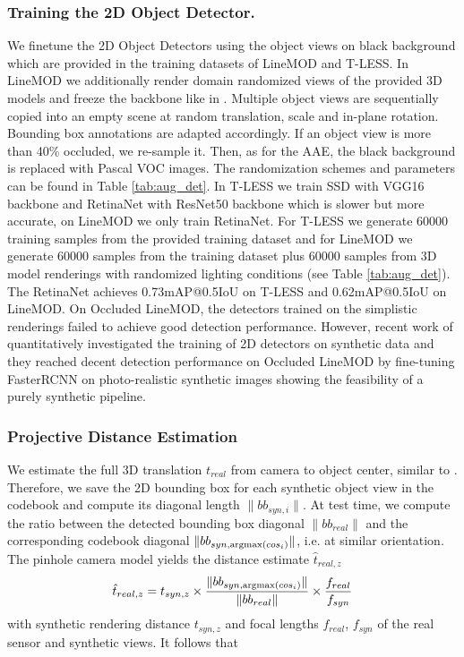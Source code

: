\subsubsection{Training the 2D Object Detector.} We finetune the 2D Object Detectors using the object views on black background  which are provided in the training datasets of LineMOD and T-LESS. In LineMOD we additionally render domain randomized views of the provided 3D models and freeze the backbone like in \cite{hinterstoisser2017pre}. Multiple object views are sequentially copied into an empty scene at random translation, scale and in-plane rotation. Bounding box annotations are adapted accordingly. If an object view is more than 40\% occluded, we re-sample it. Then, as for the \gls{AAE}, the black background is replaced with Pascal VOC images. The randomization schemes and parameters can be found in Table \ref{tab:aug_det}. In T-LESS we train SSD \citep{liu2016ssd} with VGG16 backbone and RetinaNet \citep{lin2018focal} with ResNet50 backbone which is slower but more accurate, on LineMOD we only train RetinaNet. For T-LESS we generate 60000 training samples from the provided training dataset and for LineMOD we generate 60000 samples from the training dataset plus 60000 samples from 3D model renderings with randomized lighting conditions (see Table \ref{tab:aug_det}). The RetinaNet achieves 0.73mAP@0.5IoU on T-LESS and 0.62mAP@0.5IoU on LineMOD. On Occluded LineMOD, the detectors trained on the simplistic renderings failed to achieve good detection performance. However, recent work of  \cite{Hodan2019PhotorealisticIS} quantitatively investigated the training of 2D detectors on synthetic data and they reached decent detection performance on Occluded LineMOD by fine-tuning FasterRCNN on photo-realistic synthetic images showing the feasibility of a purely synthetic pipeline.

\subsubsection{Projective Distance Estimation}
\label{sec:proj}
We estimate the full 3D translation $t_{real}$ from camera to object center, similar to \cite{kehl2017ssd}. Therefore, we save the 2D bounding box for each synthetic object view in the codebook and compute its diagonal length $\| bb_{syn,i} \|$. At test time, we compute the ratio between the detected bounding box diagonal $\| bb_{real} \|$ and the corresponding codebook diagonal $\| bb_{syn,{\operatorname*{argmax}} (cos_i) }\|$, i.e. at similar orientation. The pinhole camera model yields the distance estimate $\hat{t}_{real,z}$
\begin{equation}
\label{eq:dist}
\hat{t}_{real,z} = t_{syn,z} \times   \frac{\| bb_{syn,{\operatorname*{argmax}} (cos_i)} \|}{\| bb_{real} \|} \times \frac{f_{real}}{f_{syn}}
\end{equation} 
with synthetic rendering distance $t_{syn,z}$ and focal lengths $f_{real}$, $f_{syn}$ of the real sensor and synthetic views. It follows that

